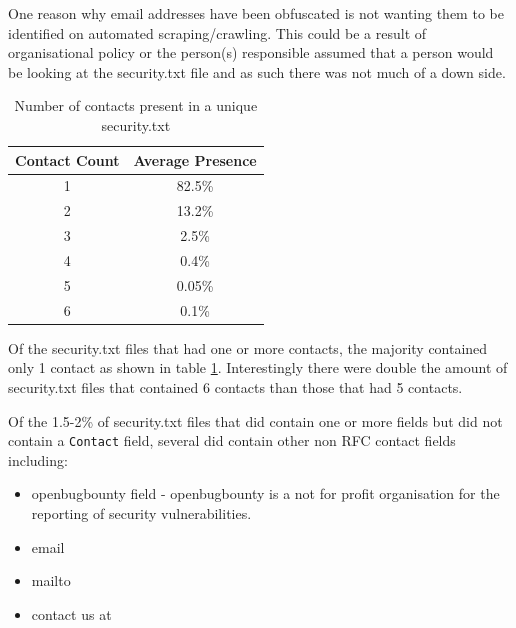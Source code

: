 \documentclass{mscreport}
\begin{document}
\noindent
One reason why email addresses have been obfuscated is not wanting them to be identified on automated scraping/crawling. This could be a result of organisational policy or the person(s) responsible assumed that a person would be looking at the security.txt file and as such there was not much of a down side.

\begin{table}[H]
  \begin{center}
    \begin{tabular}{|c|c|}  %
      \hline
      \textbf{Contact Count} & \textbf{Average Presence}\\
      \hline
      1 & 82.5\%\\
      \hline
      2 & 13.2\%\\
      \hline
      3 & 2.5\%\\
      \hline
      4 & 0.4\%\\
      \hline
      5 & 0.05\%\\
      \hline
      6 & 0.1\%\\
      \hline
    \end{tabular}
    \caption{Number of contacts present in a unique security.txt}
    \label{table:security_txt_by_contact_count} %
  \end{center}
\end{table}

\noindent
Of the security.txt files that had one or more contacts, the majority contained only 1 contact as shown in table \ref{table:security_txt_by_contact_count}. Interestingly there were double the amount of security.txt files that contained 6 contacts than those that had 5 contacts.

\vspace{0.3cm} \noindent
Of the 1.5-2\% of security.txt files that did contain one or more fields but did not contain a \texttt{Contact} field, several did contain other non RFC contact fields including:

\begin{itemize}
	\setlength\itemsep{0.01em}
    \item openbugbounty field - openbugbounty is a not for profit organisation for the reporting of security vulnerabilities.
    \item email
    \item mailto
    \item contact us at
\end{itemize}
\end{document}
